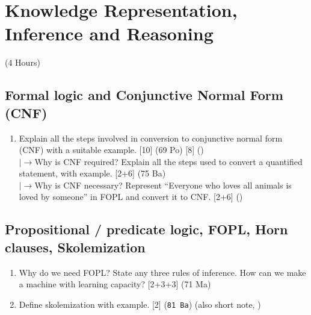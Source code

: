 \documentclass[12pt]{article}
\newcommand{\lb}{\\$\left|\rightarrow\right.$}
\begin{document}
\pagebreak
\section{Knowledge Representation, Inference and Reasoning}
\begin{center}(4 Hours)\end{center}

  \subsection{Formal logic and Conjunctive Normal Form (CNF)}
    \begin{enumerate}[topsep=0pt, noitemsep]
      \item Explain all the steps involved in conversion to conjunctive normal form (CNF) with a suitable example. \hfill [10] (69 Po) [8] ()
        \lb Why is CNF required? Explain all the steps used to convert a quantified statement, with example. \hfill [2+6] (75 Ba)
        \lb Why is CNF necessary? Represent ``Everyone who loves all animals is loved by someone'' in FOPL and convert it to CNF. \hfill [2+6] ()
    \end{enumerate}

  \subsection{Propositional / predicate logic, FOPL, Horn clauses, Skolemization}
    \begin{enumerate}[topsep=0pt, noitemsep]
      \item Why do we need FOPL? State any three rules of inference. How can we make a machine with learning capacity? \hfill [2+3+3] (71 Ma)

      \item Define skolemization with example. \hfill [2] (\texttt{81 Ba}) \quad (also short note, )
    \end{enumerate}
\end{document}
